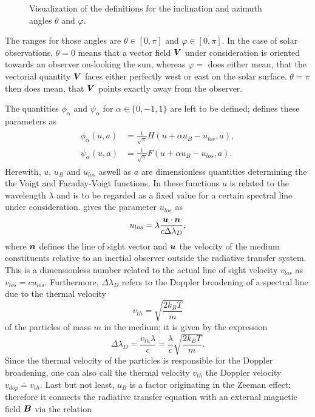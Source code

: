 \documentclass[a4paper,12pt]{report}
\begin{document}
\begin{figure}[h]
\caption{Visualization of the definitions for the inclination and azimuth angles $\theta$ and $\varphi$.}
\label{fig:inclinationazimuth}
\end{figure} The ranges for those angles are $\theta \in [0,\pi]$ and $\varphi \in [0,\pi]$. In the case of solar observations, $\theta = 0$ means that a vector field $\bm{V}$ under consideration is oriented towards an observer on-looking the sun, whereas $\varphi=$ does either mean, that the vectorial quantity $\bm{V}$ faces either perfectly west or east on the solar surface. $\theta=\pi$ then does mean, that $\bm{V}$ points exactly away from the observer.

The quantities $\phi_\alpha$ and $\psi_\alpha$ for $\alpha \in \{0,-1,1\}$ are left to be defined; \cite[p.123]{delToroIniesta.2003} defines these parameters as \begin{align}
\begin{aligned}
\phi_\alpha(u,a) &= \frac{1}{\sqrt{\pi}}H(u + \alpha u_B - u_{los}, a), \\
\psi_\alpha(u,a) &= \frac{1}{\sqrt{\pi}}F(u + \alpha u_B - u_{los},a).
\end{aligned}
\end{align} Herewith, $u$, $u_B$ and $u_{los}$ aswell as $a$ are dimensionless quantities determining the the Voigt and Faraday-Voigt functions. In these functions $u$ is related to the wavelength $\lambda$ and is to be regarded as a fixed value for a certain spectral line under consideration. \cite[p.21]{UitenbroekNSME.2020} gives the parameter $u_{los}$ as \begin{equation}
u_{los} = \lambda\frac{\bm{u}\cdot\bm{n}}{c\Delta\lambda_D},
\end{equation} where $\bm{n}$ defines the line of sight vector and $\bm{u}$ the velocity of the medium constituents relative to an inertial observer outside the radiative transfer system. This is a dimensionless number related to the actual line of sight velocity $v_{los}$ as $v_{los} = cu_{los}$. Furthermore, $\Delta \lambda_D$ refers to the Doppler broadening of a spectral line due to the thermal velocity \begin{equation}
v_{th} = \sqrt{\frac{2k_BT}{m}}
\end{equation} of the particles of mass $m$ in the medium; it is given by the expression \begin{equation}
\Delta \lambda_D = \frac{v_{th}\lambda}{c} = \frac{\lambda}{c}\sqrt{\frac{2k_B T}{m}}.
\end{equation} Since the thermal velocity of the particles is responsible for the Doppler broadening, one can also call the thermal velocity $v_{th}$ the Doppler velocity $v_{dop} \doteq v_{th}$. Last but not least, $u_B$ is a factor originating in the Zeeman effect; therefore it connects the radiative transfer equation with an external magnetic field $\bm{B}$ via the relation \begin{equation}

\end{equation}
\end{document}

